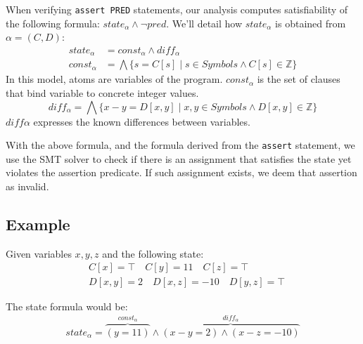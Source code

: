 When verifying \texttt{assert PRED} statements, our analysis computes satisfiability of the following formula: $state_\alpha\land\neg pred$. We'll detail how $state_\alpha$ is obtained from $\alpha = (C,D)$:
\begin{align*}
state_\alpha & = const_\alpha \land diff_\alpha \\
const_\alpha &= \bigwedge\{s = C[s] \mid s \in Symbols \wedge C[s] \in \mathbb{Z}\}
\end{align*}
In this model, atoms are variables of the program. $const_\alpha$ is the set of clauses that bind variable to concrete integer values.
\begin{equation*}
diff_\alpha = \bigwedge\{ x - y = D[x,y] \mid x,y\in Symbols \wedge D[x,y] \in \mathbb{Z}\}
\end{equation*}
$diff\alpha$ expresses the known differences between variables.

With the above formula, and the formula derived from the \texttt{assert} statement, we use the SMT solver to check if there is an assignment that satisfies the state yet violates the assertion predicate. If such assignment exists, we deem that assertion as invalid.

\subsection*{Example}
Given variables $x,y,z$ and the following state:
\begin{align*}
&C[x] = \top \quad C[y] = 11 \quad C[z] = \top \\
&D[x,y] = 2 \quad D[x,z] = -10 \quad D[y,z] = \top
\end{align*}

The state formula would be:
\begin{equation*}
state_\alpha = \overbrace{(y=11)}^{const_\alpha}\land\overbrace{(x-y=2)\land(x-z=-10)}^{diff_\alpha}
\end{equation*}
